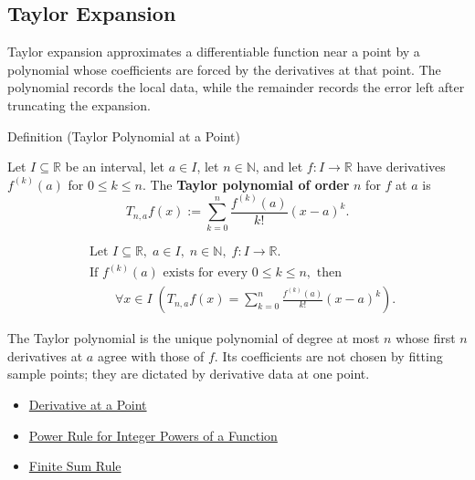 \subsection*{Taylor Expansion}
\begin{exposition}
Taylor expansion approximates a differentiable function near a point by a
polynomial whose coefficients are forced by the derivatives at that point.
The polynomial records the local data, while the remainder records the error
left after truncating the expansion.
\end{exposition}


\begin{definitionbox}{Definition (Taylor Polynomial at a Point)}
\begin{definition}
\label{def:taylor-polynomial-at-a-point}
Let $I\subseteq\mathbb{R}$ be an interval, let $a\in I$, let
$n\in\mathbb{N}$, and let $f:I\to\mathbb{R}$ have derivatives
$f^{(k)}(a)$ for $0\le k\le n$. The \textbf{Taylor polynomial of order}
$n$ for $f$ at $a$ is
\[
  T_{n,a}f(x)
  :=
  \sum_{k=0}^{n}\frac{f^{(k)}(a)}{k!}(x-a)^k.
\]
\end{definition}
\end{definitionbox}

\begin{remark*}
\[
\begin{aligned}
&\text{Let } I\subseteq\mathbb{R},\; a\in I,\; n\in\mathbb{N},\;
f:I\to\mathbb{R}.\\
&\text{If } f^{(k)}(a)\text{ exists for every }0\le k\le n,\text{ then}\\
&\qquad
\forall x\in I\;
\left(
  T_{n,a}f(x)=\sum_{k=0}^{n}\frac{f^{(k)}(a)}{k!}(x-a)^k
\right).
\end{aligned}
\]
\end{remark*}

\begin{remark*}[Interpretation]
The Taylor polynomial is the unique polynomial of degree at most $n$ whose
first $n$ derivatives at $a$ agree with those of $f$. Its coefficients are
not chosen by fitting sample points; they are dictated by derivative data at
one point.
\end{remark*}

\begin{remark*}[Dependencies]\hfill
\begin{itemize}
  \item \hyperref[def:derivative-at-a-point]{Derivative at a Point}
  \item \hyperref[cor:power-rule-special-case]{Power Rule for Integer Powers of a Function}
  \item \hyperref[cor:finite-sum-rule]{Finite Sum Rule}
\end{itemize}
\end{remark*}

